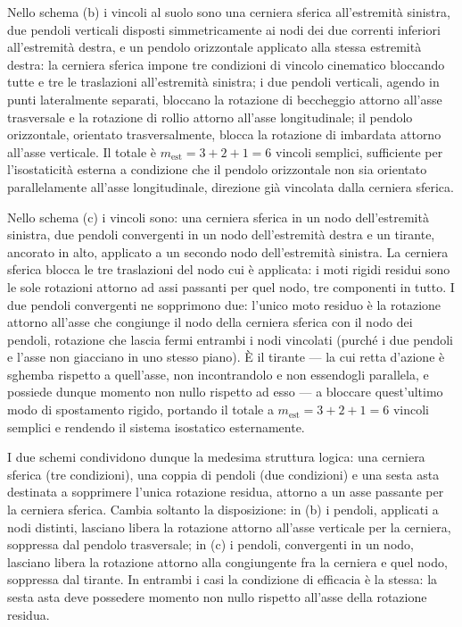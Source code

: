 Nello schema (b) i vincoli al suolo sono una cerniera
sferica all'estremità sinistra, due pendoli verticali
disposti simmetricamente ai nodi dei due correnti
inferiori all'estremità destra, e un pendolo orizzontale
applicato alla stessa estremità destra: la cerniera
sferica impone tre condizioni di vincolo cinematico
bloccando tutte e tre le traslazioni all'estremità
sinistra; i due pendoli verticali, agendo in punti
lateralmente separati, bloccano la rotazione di
beccheggio attorno all'asse trasversale e la rotazione
di rollio attorno all'asse longitudinale; il pendolo
orizzontale, orientato trasversalmente, blocca la
rotazione di imbardata attorno all'asse verticale.
Il totale è $m_{\text{est}} = 3 + 2 + 1 = 6$ vincoli
semplici, sufficiente per l'isostaticità esterna a
condizione che il pendolo orizzontale non sia orientato
parallelamente all'asse longitudinale, direzione già
vincolata dalla cerniera sferica.


Nello schema (c) i vincoli sono: una cerniera sferica
in un nodo dell'estremità sinistra, due pendoli
convergenti in un nodo dell'estremità destra e un
tirante, ancorato in alto, applicato a un secondo
nodo dell'estremità sinistra. La cerniera sferica
blocca le tre traslazioni del nodo cui è applicata:
i moti rigidi residui sono le sole rotazioni attorno
ad assi passanti per quel nodo, tre componenti in
tutto. I due pendoli convergenti ne sopprimono due:
l'unico moto residuo è la rotazione attorno all'asse
che congiunge il nodo della cerniera sferica con il
nodo dei pendoli, rotazione che lascia fermi entrambi
i nodi vincolati (purché i due pendoli e l'asse non
giacciano in uno stesso piano). È il tirante --- la
cui retta d'azione è sghemba rispetto a quell'asse,
non incontrandolo e non essendogli parallela, e
possiede dunque momento non nullo rispetto ad esso ---
a bloccare quest'ultimo modo di spostamento rigido,
portando il totale a
$m_{\text{est}} = 3 + 2 + 1 = 6$ vincoli semplici
e rendendo il sistema isostatico esternamente.

I due schemi condividono dunque la medesima struttura
logica: una cerniera sferica (tre condizioni), una
coppia di pendoli (due condizioni) e una sesta asta
destinata a sopprimere l'unica rotazione residua,
attorno a un asse passante per la cerniera sferica.
Cambia soltanto la disposizione: in (b) i pendoli,
applicati a nodi distinti, lasciano libera la
rotazione attorno all'asse verticale per la cerniera,
soppressa dal pendolo trasversale; in (c) i pendoli,
convergenti in un nodo, lasciano libera la rotazione
attorno alla congiungente fra la cerniera e quel nodo,
soppressa dal tirante. In entrambi i casi la condizione
di efficacia è la stessa: la sesta asta deve possedere
momento non nullo rispetto all'asse della rotazione
residua.

